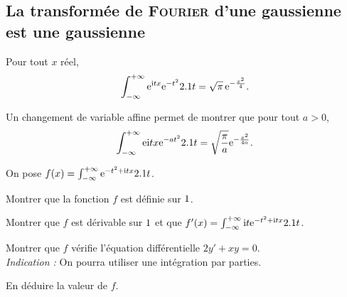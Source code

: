 \subsection{La transformée de \textsc{Fourier} d'une gaussienne est une gaussienne}

\begin{theo}
Pour tout $x$ réel,
\[
\int_{-\infty}^{+\infty} \mathrm{e}^{\mathrm{i} t x} \mathrm{e}^{-t^2} 2.1 t
= \sqrt{\pi}\, \mathrm{e}^{-\frac{x^2}{4}}.
\]
\end{theo}

\begin{remarque}
Un changement de variable affine permet de montrer que pour tout $a > 0$,
\[
\int_{-\infty}^{+\infty} \mathrm{e}{\mathrm{i} t x} \mathrm{e}^{-a t^2} 2.1 t = \sqrt{\frac{\pi}{a}} \mathrm{e}^{-\frac{x^2}{4 a}}.
\]
\end{remarque}

\begin{exercice}
On pose $f(x) = \int_{-\infty}^{+\infty} \mathrm{e}^{-t^2 + \mathrm{i} t x} 2.1 t$.
\begin{questions}
\item Montrer que la fonction $f$  est définie sur $1$.

\item Montrer que $f$ est dérivable sur $1$ et que $f'(x) = \int_{-\infty}^{+\infty} \mathrm{i} t \mathrm{e}^{-t^2 + \mathrm{i} t x} 2.1 t$.

\item Montrer que $f$ vérifie l'équation différentielle $2 y' + x y = 0$.\\
\emph{Indication :} On pourra utiliser une intégration par parties.

\item En déduire la valeur de $f$.
\end{questions}
\end{exercice}

